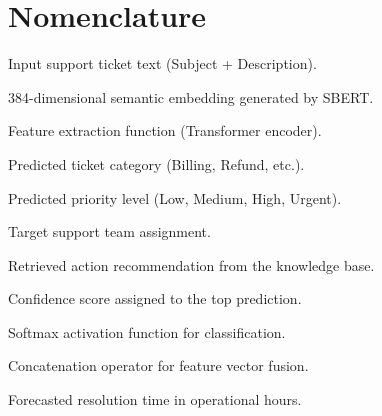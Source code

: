 \documentclass[conference]{IEEEtran}
\begin{document}
\section*{Nomenclature}
\begin{IEEEdescription}
\item[$T$] Input support ticket text (Subject + Description).
\item[$E$] 384-dimensional semantic embedding generated by SBERT.
\item[$f_{\theta}$] Feature extraction function (Transformer encoder).
\item[$C$] Predicted ticket category (Billing, Refund, etc.).
\item[$Pr$] Predicted priority level (Low, Medium, High, Urgent).
\item[$T_m$] Target support team assignment.
\item[$A$] Retrieved action recommendation from the knowledge base.
\item[$conf$] Confidence score assigned to the top prediction.
\item[$\sigma$] Softmax activation function for classification.
\item[$\oplus$] Concatenation operator for feature vector fusion.
\item[$H$] Forecasted resolution time in operational hours.
\end{IEEEdescription}

\begin{abstract}
Modern customer support systems receive thousands of service requests daily through email, chat, and web portals, making manual ticket classification both time-consuming and error-prone. While existing automated approaches improve routing through basic keyword matching, they often fail to capture semantic intent and provide limited actionable guidance to support agents. This paper presents an end-to-end Semantic AI system that addresses these limitations by integrating deep semantic understanding, multi-task prediction, and knowledge-based action recommendation within a unified pipeline. Our approach employs Sentence-BERT (SBERT) embeddings to capture contextual meaning in ticket descriptions, combined with lightweight machine learning classifiers for category prediction, team assignment, priority estimation, and resolution time forecasting. Additionally, we introduce a semantic action retrieval module that leverages historical resolution data to generate concise, actionable instructions without relying on computationally expensive large language models. A confidence-based routing mechanism balances automation efficiency with human oversight by flagging low-confidence predictions for manual review. Experimental evaluation on a unified dataset of 28,587 real-world customer support tickets demonstrates 94.2\% classification accuracy with an average inference latency of 120 milliseconds, making the system suitable for deployment in high-volume enterprise support environments.
\end{abstract}
\end{document}
